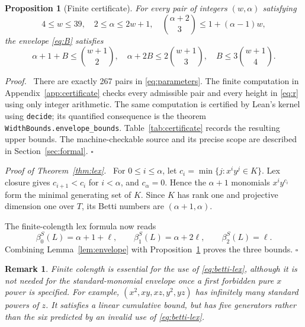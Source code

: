 \documentclass[11pt,a4paper]{article}
\newtheorem{proposition}[theorem]{Proposition}
\newtheorem{remark}[theorem]{Remark}
\newenvironment{proof}[1][Proof]{\par\noindent\textit{#1.}\ \ignorespaces}{\unskip\nobreak\hfill\ensuremath{\square}\par}
\begin{document}
\begin{proposition}[Finite certificate]\label{prop:certificate}
For every pair of integers $(w,\alpha)$ satisfying
\begin{equation}\label{eq:parameters}
 4\le w\le39,\quad 2\le\alpha\le2w+1,\quad
 \binom{\alpha+2}{3}\le1+(\alpha-1)w,
\end{equation}
the envelope \eqref{eq:B} satisfies
\begin{equation}\label{eq:certificate}
 \alpha+1+B\le\binom{w+1}{2},\quad
 \alpha+2B\le2\binom{w+1}{3},\quad
 B\le3\binom{w+1}{4}.
\end{equation}
\end{proposition}
\begin{proof}
There are exactly 267 pairs in \eqref{eq:parameters}. The finite computation in Appendix~\ref{app:certificate} checks every admissible pair and every height in \eqref{eq:r} using only integer arithmetic. The same computation is certified by Lean's kernel using \texttt{decide}; its quantified consequence is the theorem \texttt{WidthBounds.envelope\_bounds}. Table~\ref{tab:certificate} records the resulting upper bounds. The machine-checkable source and its precise scope are described in Section~\ref{sec:formal}.
\end{proof}

\begin{proof}[Proof of Theorem~\ref{thm:lex}]
For $0\le i\le\alpha$, let $c_i=\min\{j:x^iy^j\in K\}$. Lex closure gives $c_{i+1}<c_i$ for $i<\alpha$, and $c_\alpha=0$. Hence the $\alpha+1$ monomials $x^iy^{c_i}$ form the minimal generating set of $K$. Since $K$ has rank one and projective dimension one over $T$, its Betti numbers are $(\alpha+1,\alpha)$.

The finite-colength lex formula \cite[equation~(7)]{CMS} now reads
\begin{equation}\label{eq:betti-lex}
 \beta_0^S(L)=\alpha+1+\ell,\qquad
 \beta_1^S(L)=\alpha+2\ell,\qquad
 \beta_2^S(L)=\ell.
\end{equation}
Combining Lemma~\ref{lem:envelope} with Proposition~\ref{prop:certificate} proves the three bounds.
\end{proof}

\begin{remark}\label{rem:finite}
Finite colength is essential for the use of \eqref{eq:betti-lex}, although it is not needed for the standard-monomial envelope once a first forbidden pure $x$ power is specified. For example, $(x^2,xy,xz,y^2,yz)$ has infinitely many standard powers of $z$. It satisfies a linear cumulative bound, but has five generators rather than the six predicted by an invalid use of \eqref{eq:betti-lex}.
\end{remark}
\end{document}

